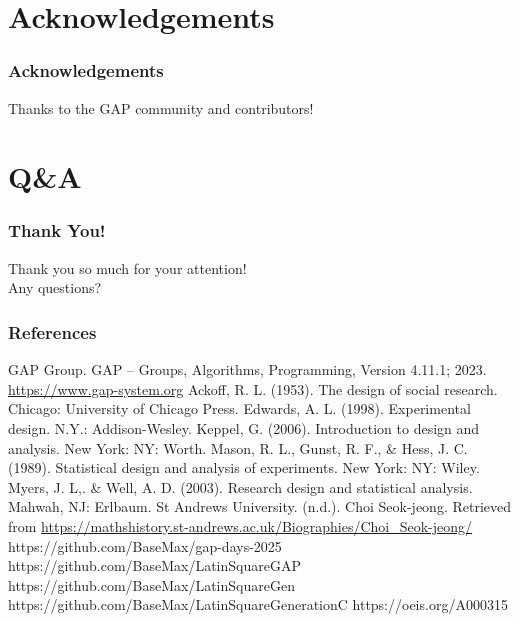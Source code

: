 \documentclass{beamer}
\begin{document}
\section{Acknowledgements}
\begin{frame}
\frametitle{Acknowledgements}
Thanks to the GAP community and contributors!
\end{frame}

\section{Q\&A}
\begin{frame}
	\frametitle{Thank You!}
	\centering
	\Large Thank you so much for your attention!\\[1em]
	\Large Any questions?
\end{frame}

\begin{frame}[allowframebreaks]
\frametitle{References}
\begin{thebibliography}{99}
 GAP Group. GAP -- Groups, Algorithms, Programming, Version 4.11.1; 2023. \url{https://www.gap-system.org}
 Ackoff, R. L. (1953). The design of social research. Chicago: University of Chicago Press.
 Edwards, A. L. (1998). Experimental design. N.Y.: Addison-Wesley.
 Keppel, G. (2006). Introduction to design and analysis. New York: NY: Worth.
 Mason, R. L., Gunst, R. F., \& Hess, J. C. (1989). Statistical design and analysis of experiments. New York: NY: Wiley.
 Myers, J. L,. \& Well, A. D. (2003). Research design and statistical analysis. Mahwah, NJ: Erlbaum.
 St Andrews University. (n.d.). Choi Seok-jeong. Retrieved from \url{https://mathshistory.st-andrews.ac.uk/Biographies/Choi_Seok-jeong/}
 https://github.com/BaseMax/gap-days-2025
 https://github.com/BaseMax/LatinSquareGAP
 https://github.com/BaseMax/LatinSquareGen
 https://github.com/BaseMax/LatinSquareGenerationC
 https://oeis.org/A000315
\end{thebibliography}
\end{frame}
\end{document}
